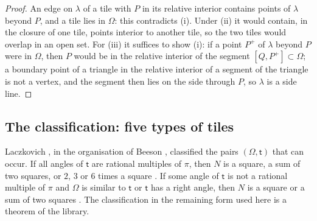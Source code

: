 \documentclass[11pt,reqno]{amsart}
\theoremstyle{plain}
\theoremstyle{definition}
\begin{document}
\begin{proof}
An edge on $\lambda$ of a tile with $P$ in its relative interior contains points of $\lambda$ beyond $P$, and a tile lies in $\Omega$: this contradicts (i). Under (ii) it would contain, in the closure of one tile, points interior to another tile, so the two tiles would overlap in an open set. For (iii) it suffices to show (i): if a point $P^+$ of $\lambda$ beyond $P$ were in $\Omega$, then $P$ would be in the relative interior of the segment $[Q,P^+]\subset\Omega$; a boundary point of a triangle in the relative interior of a segment of the triangle is not a vertex, and the segment then lies on the side through $P$, so $\lambda$ is a side line.
\end{proof}

\subsection{The classification: five types of tiles}\label{sub:types}
Laczkovich \cite{Laczkovich1995,Laczkovich2012}, in the organisation of Beeson \cite{BeesonSeven}, classified the pairs $(\Omega,\mathsf t)$ that can occur. If all angles of $\mathsf t$ are rational multiples of $\pi$, then $N$ is a square, a sum of two squares, or $2$, $3$ or $6$ times a square \cite{BeesonSeven}. If some angle of $\mathsf t$ is not a rational multiple of $\pi$ and $\Omega$ is similar to $\mathsf t$ or $\mathsf t$ has a right angle, then $N$ is a square or a sum of two squares \cite{BeesonI,SWW}. The classification in the remaining form used here is a theorem of the library.
\end{document}
